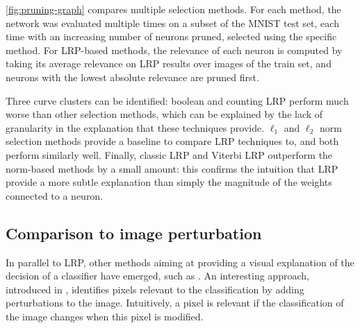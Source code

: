 \documentclass{../cs-classes/cs-classes}
\newcommand*{\1}{\digitsbb{1}}
\newcommand*{\0}{\digitsbb{0}}
\begin{document}
\autoref{fig:pruning-graph} compares multiple selection methods. For each method, the network was evaluated multiple times on a subset of the MNIST test set, each time with an increasing number of neurons pruned, selected using the specific method. For LRP-based methods, the relevance of each neuron is computed by taking its average relevance on LRP results over images of the train set, and neurons with the lowest absolute relevance are pruned first.

Three curve clusters can be identified: boolean and counting LRP perform much worse than other selection methods, which can be explained by the lack of granularity in the explanation that these techniques provide. $\ell_1$ and $\ell_2$ norm selection methods provide a baseline to compare LRP techniques to, and both perform similarly well. Finally, classic LRP and Viterbi LRP outperform the norm-based methods by a small amount: this confirms the intuition that LRP provide a more subtle explanation than simply the magnitude of the weights connected to a neuron.

\subsection{Comparison to image perturbation}
In parallel to LRP, other methods aiming at providing a visual explanation of the decision of a classifier have emerged, such as \cite{inverting,visualizing-cnn}. An interesting approach, introduced in \cite{fong2017interpretable}, identifies pixels relevant to the classification by adding perturbations to the image. Intuitively, a pixel is relevant if the classification of the image changes when this pixel is modified. 
\end{document}
